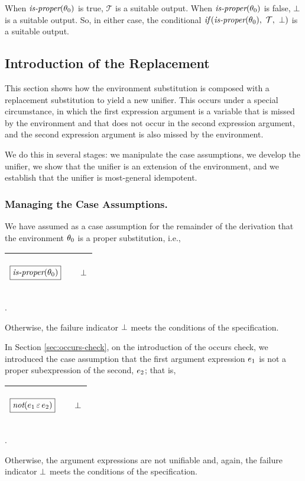 \documentclass[runningheads]{llncs}
\DeclareMathOperator{\unot}{\emph{not}\kern-.0pt}
\begin{document}
\noindent 
When $\emph{is-proper}(\theta_{0})$ is true, $\mathcal{T}$ is a suitable output. 
When $\emph{is-proper}(\theta_{0})$ is false, $\bot$ is a suitable output. So, in either case, the conditional $\emph{if}\,( {\emph{is-proper}(\theta_{0})},\allowbreak \ {\mathcal{T}},\allowbreak \ {\bot})$ is a suitable output.
\subsection{Introduction of the Replacement}\label{sec:replacement}
This section shows how the environment substitution is composed with a replacement substitution to yield a new unifier.  This occurs under a special circumstance, in which the first expression argument is a variable that is missed by the environment and that does not occur in the second expression argument, and the second expression argument is also missed by the environment.  

We do this in several stages:  we manipulate the case assumptions, we develop the unifier, we show that the unifier is an extension of the environment, and we establish that the unifier is most-general idempotent.


\subsubsection{Managing the Case Assumptions.}
We have assumed as a case assumption for the remainder of the derivation that 
the environment $\theta_{0}$ is a proper substitution, i.e.,
\begin{center}
  \begin{tabular}{|m{}|m{}||m{}|}
\hline
\begin{center}
$\boxed{\emph{is-proper}(\theta_{0})}$
\end{center}& & \begin{center} $\bot$ \end{center} \\  \hline
\end{tabular}.
\end{center}
Otherwise, the failure indicator $\bot$ meets the conditions of the specification.

In Section \ref{sec:occurs-check}, on the introduction of the occurs check, we introduced the case assumption that the first argument expression
 $e_{1}$ is not a proper subexpression of the second, $e_{2}$; that is,
\begin{center}
  \begin{tabular}{|m{}|m{}||m{}|}
\hline
\begin{center}
$\boxed{\unot(\e{1} \occursin \e{2})}$
\end{center}& & \begin{center} $\bot$ \end{center} \\  \hline
\end{tabular}.
\end{center}
Otherwise, the argument expressions are not unifiable and, again, the failure indicator $\bot$ meets the conditions of the specification.
\end{document}
